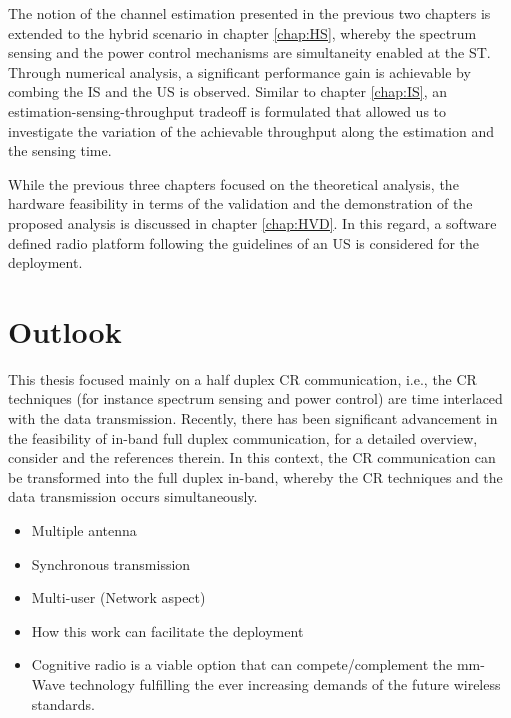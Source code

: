 The notion of the channel estimation presented in the previous two chapters is extended to the hybrid scenario in chapter \ref{chap:HS}, whereby the spectrum sensing and the power control mechanisms are simultaneity enabled at the ST. Through numerical analysis, a significant performance gain is achievable by combing the IS and the US is observed. Similar to chapter \ref{chap:IS}, an estimation-sensing-throughput tradeoff is formulated that allowed us to investigate the variation of the achievable throughput along the estimation and the sensing time. 

While the previous three chapters focused on the theoretical analysis, the hardware feasibility in terms of the validation and the demonstration of the proposed analysis is discussed in chapter \ref{chap:HVD}. In this regard, a software defined radio platform following the guidelines of an US is considered for the deployment. 


\section{Outlook}
This thesis focused mainly on a half duplex CR communication, i.e., the CR techniques (for instance spectrum sensing and power control) are time interlaced with the data transmission. Recently, there has been significant advancement in the feasibility of in-band full duplex communication, for a detailed overview, consider \cite{Liao15, Kim15} and the references therein. In this context, the CR communication can be transformed into the full duplex in-band, whereby the CR techniques and the data transmission occurs simultaneously.  
\begin{itemize}
\item Multiple antenna
\item Synchronous transmission \cite{Jiang13_, Jiang15} 
\item Multi-user (Network aspect)
\item How this work can facilitate the deployment
\item Cognitive radio is a viable option that can compete/complement the mm-Wave technology fulfilling the ever increasing demands of the future wireless standards.  
\end{itemize}










